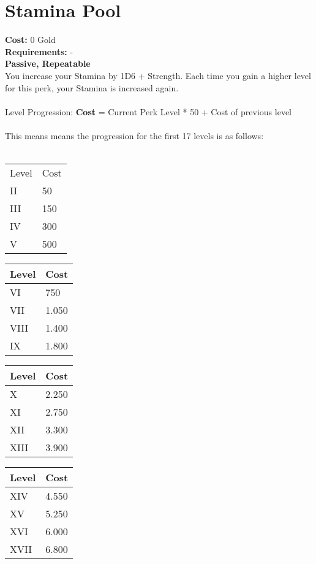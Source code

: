 \section{Stamina Pool}\label{sec:staminapool}
\textbf{Cost:} 0 Gold\\
\textbf{Requirements:} -\\
\textbf{Passive, Repeatable}\\
You increase your Stamina by 1D6 + Strength.
Each time you gain a higher level for this perk, your Stamina is increased again.\\
\\
Level Progression: \textbf{Cost} = Current Perk Level * 50 + Cost of previous level\\
\\
This means means the progression for the first 17 levels is as follows:\\
\\
\begin{minipage}{0.25\textwidth}
    \begin{tabular}{l | l}
        Level & Cost\\
        II & 50\\
        III & 150\\
        IV & 300\\
        V & 500\\
    \end{tabular}
\end{minipage}
\begin{minipage}{0.25\textwidth}
    \begin{tabular}{l | l}
        Level & Cost\\ \hline
        VI & 750\\
        VII & 1.050\\
        VIII & 1.400\\
        IX & 1.800\\
    \end{tabular}
\end{minipage}
\begin{minipage}{0.25\textwidth}
    \begin{tabular}{l | l}
        Level & Cost\\ \hline
        X & 2.250\\
        XI & 2.750\\
        XII & 3.300\\
        XIII & 3.900\\
    \end{tabular}
\end{minipage}
\begin{minipage}{0.25\textwidth}
    \begin{tabular}{l | l}
        Level & Cost\\ \hline
        XIV & 4.550\\
        XV & 5.250\\
        XVI & 6.000\\
        XVII & 6.800\\
    \end{tabular}
\end{minipage}